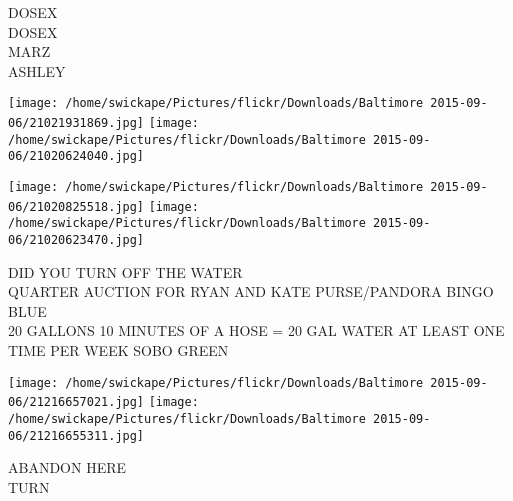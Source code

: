 \documentclass[10pt,letterpaper]{article}
\begin{document}
DOSEX\\
DOSEX\\
MARZ\\
ASHLEY
\pagebreak

\texttt{[image: /home/swickape/Pictures/flickr/Downloads/Baltimore 2015-09-06/21021931869.jpg]}
\texttt{[image: /home/swickape/Pictures/flickr/Downloads/Baltimore 2015-09-06/21020624040.jpg]}

\texttt{[image: /home/swickape/Pictures/flickr/Downloads/Baltimore 2015-09-06/21020825518.jpg]}
\texttt{[image: /home/swickape/Pictures/flickr/Downloads/Baltimore 2015-09-06/21020623470.jpg]}

DID YOU TURN OFF THE WATER\\
QUARTER AUCTION FOR RYAN AND KATE PURSE/PANDORA BINGO\\
BLUE\\
20 GALLONS 10 MINUTES OF A HOSE = 20 GAL WATER AT LEAST ONE TIME PER WEEK SOBO GREEN
\pagebreak

\texttt{[image: /home/swickape/Pictures/flickr/Downloads/Baltimore 2015-09-06/21216657021.jpg]}
\texttt{[image: /home/swickape/Pictures/flickr/Downloads/Baltimore 2015-09-06/21216655311.jpg]}

ABANDON HERE\\
TURN
\pagebreak
\end{document}
